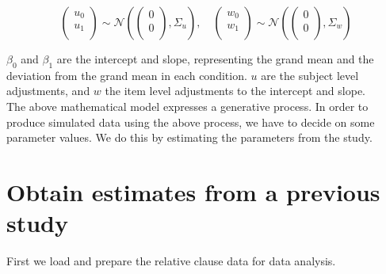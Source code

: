 \documentclass[
  12pt,
]{krantz}
\newenvironment{Shaded}{\begin{snugshade}}{\end{snugshade}}
\newcommand{\AttributeTok}[1]{\textcolor[rgb]{0.77,0.63,0.00}{#1}}
\newcommand{\ConstantTok}[1]{\textcolor[rgb]{0.00,0.00,0.00}{#1}}
\newcommand{\DecValTok}[1]{\textcolor[rgb]{0.00,0.00,0.81}{#1}}
\newcommand{\FunctionTok}[1]{\textcolor[rgb]{0.00,0.00,0.00}{#1}}
\newcommand{\NormalTok}[1]{#1}
\newcommand{\OtherTok}[1]{\textcolor[rgb]{0.56,0.35,0.01}{#1}}
\newcommand{\SpecialCharTok}[1]{\textcolor[rgb]{0.00,0.00,0.00}{#1}}
\newcommand{\StringTok}[1]{\textcolor[rgb]{0.31,0.60,0.02}{#1}}
\theoremstyle{definition}
\theoremstyle{definition}
\theoremstyle{definition}
\theoremstyle{definition}
\theoremstyle{remark}
\begin{document}
\begin{equation}\label{eq:jointpriordistsimulation}
\begin{pmatrix}
  u_0 \\ 
  u_1 \\
\end{pmatrix}
\sim 
\mathcal{N} \left(
\begin{pmatrix}
  0 \\
  0 \\
\end{pmatrix},
\Sigma_{u}
\right),
\quad
\begin{pmatrix}
  w_0 \\ 
  w_1 \\
\end{pmatrix}
\sim 
\mathcal{N}\left(
\begin{pmatrix}
  0 \\
  0 \\
\end{pmatrix},
\Sigma_{w}
\right)
\end{equation}

\(\beta_0\) and \(\beta_1\) are the intercept and slope, representing the grand mean and the deviation from the grand mean in each condition. \(u\) are the subject level adjustments, and \(w\) the item level adjustments to the intercept and slope.\\
The above mathematical model expresses a generative process. In order to produce simulated data using the above process, we have to decide on some parameter values. We do this by estimating the parameters from the \citet{grodner} study.

\hypertarget{obtain-estimates-from-a-previous-study}{%
\section{Obtain estimates from a previous study}\label{obtain-estimates-from-a-previous-study}}

First we load and prepare the relative clause data for data analysis.

\begin{Shaded}
\end{Shaded}
\end{document}
